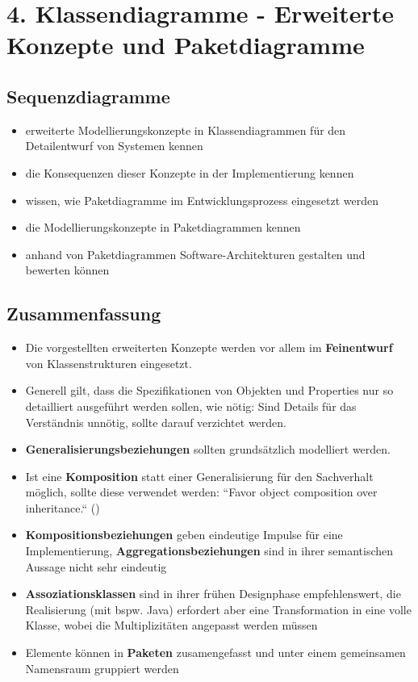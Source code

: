 \section*{4. Klassendiagramme - Erweiterte Konzepte und Paketdiagramme}

\subsection*{Sequenzdiagramme}
\begin{itemize}
    \item erweiterte Modellierungskonzepte in Klassendiagrammen für den Detailentwurf von Systemen kennen
    \item die Konsequenzen dieser Konzepte in der Implementierung kennen
    \item wissen, wie Paketdiagramme im Entwicklungsprozess eingesetzt werden
    \item die Modellierungskonzepte in Paketdiagrammen kennen
    \item anhand von Paketdiagrammen Software-Architekturen gestalten und bewerten können
\end{itemize}

\subsection*{Zusammenfassung}

\begin{itemize}
    \item Die vorgestellten erweiterten Konzepte werden vor allem im \textbf{Feinentwurf} von Klassenstrukturen eingesetzt.
    \item Generell gilt, dass die Spezifikationen von Objekten und Properties nur so detailliert ausgeführt werden sollen, wie nötig: Sind Details für das Verständnis unnötig, sollte darauf verzichtet werden.
    \item \textbf{Generalisierungsbeziehungen} sollten grundsätzlich modelliert werden.
    \item Ist eine \textbf{Komposition} statt einer Generalisierung für den Sachverhalt möglich, sollte diese verwendet werden: ``Favor object composition over inheritance.`` (\cite[19 f.]{GHJV94})
    \item \textbf{Kompositionsbeziehungen} geben eindeutige Impulse für eine Implementierung, \textbf{Aggregationsbeziehungen} sind in ihrer semantischen Aussage nicht sehr eindeutig
    \item \textbf{Assoziationsklassen} sind in ihrer frühen Designphase empfehlenswert, die Realisierung (mit {bspw.} Java) erfordert aber eine Transformation in eine volle Klasse, wobei die Multiplizitäten angepasst werden müssen
    \item Elemente können in \textbf{Paketen} zusamengefasst und unter einem gemeinsamen Namensraum gruppiert werden
\end{itemize}

